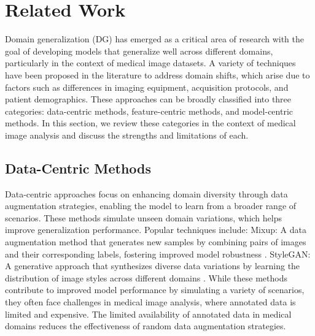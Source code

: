\section{Related Work}
\label{sec:related_work}


Domain generalization (DG) has emerged as a critical area of research with the goal of developing models that generalize well across different domains, particularly in the context of medical image datasets. 
A variety of techniques have been proposed in the literature to address domain shifts, which arise due to factors such as differences in imaging equipment, acquisition protocols, and patient demographics. 
These approaches can be broadly classified into three categories: data-centric methods, feature-centric methods, and model-centric methods. 
In this section, we review these categories in the context of medical image analysis and discuss the strengths and limitations of each.

\subsection{Data-Centric Methods}

Data-centric approaches focus on enhancing domain diversity through data augmentation strategies, enabling the model to learn from a broader range of scenarios. These methods simulate unseen domain variations, which helps improve generalization performance. Popular techniques include:
Mixup: A data augmentation method that generates new samples by combining pairs of images and their corresponding labels, fostering improved model robustness \cite{zhang2017mixup}.
StyleGAN: A generative approach that synthesizes diverse data variations by learning the distribution of image styles across different domains \cite{karras2019style}.
While these methods contribute to improved model performance by simulating a variety of scenarios, they often face challenges in medical image analysis, where annotated data is limited and expensive. The limited availability of annotated data in medical domains reduces the effectiveness of random data augmentation strategies.

